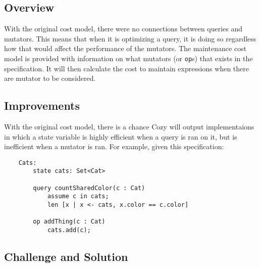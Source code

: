 \newcommand{\code}[1]{\texttt{#1}}

\subsection{Overview}
With the original cost model, there were no connections between queries and
mutators. This means that when it is optimizing a query, it is doing so
regardless how that would affect the performance of the mutators. 
The maintenance cost model is provided with information on what mutators (or
\code{op}s) that exists in the specification. It will then calculate the cost to
maintain expressions when there are mutator to be considered.

\subsection{Improvements}
With the original cost model, there is a chance Cozy will output implementaions
in which a state variable is highly efficient when a query is ran on it, but
is inefficient when a mutator is ran. For example, given this specification: 

\begin{lstlisting}
    Cats:
        state cats: Set<Cat>

        query countSharedColor(c : Cat)
            assume c in cats;
            len [x | x <- cats, x.color == c.color]

        op addThing(c : Cat)
            cats.add(c);
\end{lstlisting}

\subsection{Challenge and Solution}
